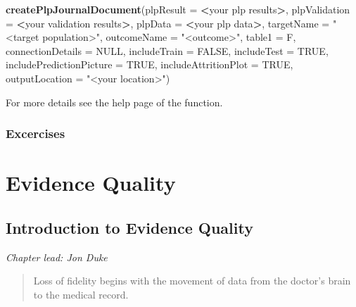 \documentclass[11pt]{book}
\newenvironment{Shaded}{\begin{snugshade}}{\end{snugshade}}
\newcommand{\KeywordTok}[1]{\textcolor[rgb]{0.13,0.29,0.53}{\textbf{#1}}}
\newcommand{\DataTypeTok}[1]{\textcolor[rgb]{0.13,0.29,0.53}{#1}}
\newcommand{\StringTok}[1]{\textcolor[rgb]{0.31,0.60,0.02}{#1}}
\newcommand{\OtherTok}[1]{\textcolor[rgb]{0.56,0.35,0.01}{#1}}
\newcommand{\OperatorTok}[1]{\textcolor[rgb]{0.81,0.36,0.00}{\textbf{#1}}}
\newcommand{\NormalTok}[1]{#1}
\begin{document}
\begin{Shaded}
\begin{Highlighting}[]
 \KeywordTok{createPlpJournalDocument}\NormalTok{(}\DataTypeTok{plpResult =} \OperatorTok{<}\NormalTok{your plp results}\OperatorTok{>}\NormalTok{,}
                          \DataTypeTok{plpValidation =} \OperatorTok{<}\NormalTok{your validation results}\OperatorTok{>}\NormalTok{,}
                          \DataTypeTok{plpData =} \OperatorTok{<}\NormalTok{your plp data}\OperatorTok{>}\NormalTok{,}
                          \DataTypeTok{targetName =} \StringTok{"<target population>"}\NormalTok{,}
                          \DataTypeTok{outcomeName =} \StringTok{"<outcome>"}\NormalTok{,}
                          \DataTypeTok{table1 =}\NormalTok{ F,}
                          \DataTypeTok{connectionDetails =} \OtherTok{NULL}\NormalTok{,}
                          \DataTypeTok{includeTrain =} \OtherTok{FALSE}\NormalTok{,}
                          \DataTypeTok{includeTest =} \OtherTok{TRUE}\NormalTok{,}
                          \DataTypeTok{includePredictionPicture =} \OtherTok{TRUE}\NormalTok{,}
                          \DataTypeTok{includeAttritionPlot =} \OtherTok{TRUE}\NormalTok{,}
                          \DataTypeTok{outputLocation =} \StringTok{"<your location>"}\NormalTok{)}
\end{Highlighting}
\end{Shaded}

For more details see the help page of the function.

\section{Excercises}\label{excercises-1}

\part{Evidence Quality}\label{part-evidence-quality}

\chapter{Introduction to Evidence Quality}\label{EvidenceQuality}

\emph{Chapter lead: Jon Duke}

\begin{quote}
Loss of fidelity begins with the movement of data from the doctor's
brain to the medical record.
\end{quote}
\end{document}
